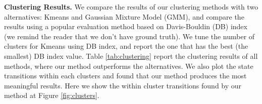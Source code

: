 %
{\bf Clustering Results.} We compare the results of our clustering methods with two alternatives: Kmeans and Gaussian Mixture Model (GMM),
and compare the results using a popular evaluation method based on Davis-Bouldin (DB) index \cite{dbindex} (we remind the reader that we don't have ground truth). 
We tune the number of clusters for Kmeans using DB index, and report the one that has the best (the smallest) DB index value. 
Table \ref{tab:clustering} report the clustering results of all methods, 
where our method outperforms the alternatives. We also plot the state transitions within each clusters  
and found that our method produces the most meaningful results. Here we show the within cluster transitions found by our
method at Figure \ref{fig:clusters}.  



